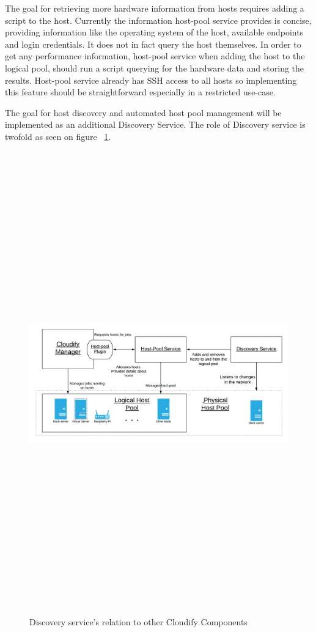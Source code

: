 The goal for retrieving more hardware information from hosts requires adding a script to the host. Currently the information host-pool service provides is concise, providing information like the operating system of the host, available endpoints and login credentials. It does not in fact query the host themselves. In order to get any performance information, host-pool service when adding the host to the logical pool, should run a script querying for the hardware data and storing the results. Host-pool service already has SSH access to all hosts so implementing this feature should be straightforward especially in a restricted use-case.

The goal for host discovery and automated host pool management will be implemented as an additional Discovery Service.
The role of Discovery service is twofold as seen on figure ~\ref{fig:discovery_service}.


\begin{figure}[ht!]
\centering
  \includegraphics[width=15cm,height=20cm, keepaspectratio]{Discovery_service.png}%
  \caption{Discovery service's relation to other Cloudify Components}
  \label{fig:discovery_service}
\end{figure}

